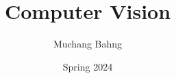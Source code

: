 \documentclass{article}
\begin{document}
\title{Computer Vision}
\author{Muchang Bahng}
\date{Spring 2024}

\maketitle
\tableofcontents
\pagebreak 











\end{document}
